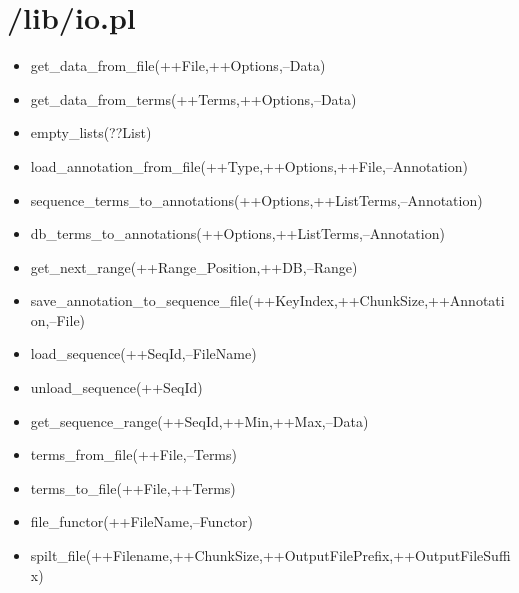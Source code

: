 \section{/lib/io.pl}

\begin{itemize}
\item get\_data\_from\_file(++File,++Options,--Data)
\item get\_data\_from\_terms(++Terms,++Options,--Data)
\item empty\_lists(??List)
\item load\_annotation\_from\_file(++Type,++Options,++File,--Annotation)
\item sequence\_terms\_to\_annotations(++Options,++ListTerms,--Annotation)
\item db\_terms\_to\_annotations(++Options,++ListTerms,--Annotation)
\item get\_next\_range(++Range\_Position,++DB,--Range)
\item save\_annotation\_to\_sequence\_file(++KeyIndex,++ChunkSize,++Annotation,--File)
\item load\_sequence(++SeqId,--FileName)
\item unload\_sequence(++SeqId)
\item get\_sequence\_range(++SeqId,++Min,++Max,--Data)
\item terms\_from\_file(++File,--Terms)
\item terms\_to\_file(++File,++Terms)
\item file\_functor(++FileName,--Functor)
\item spilt\_file(++Filename,++ChunkSize,++OutputFilePrefix,++OutputFileSuffix)
\end{itemize}



